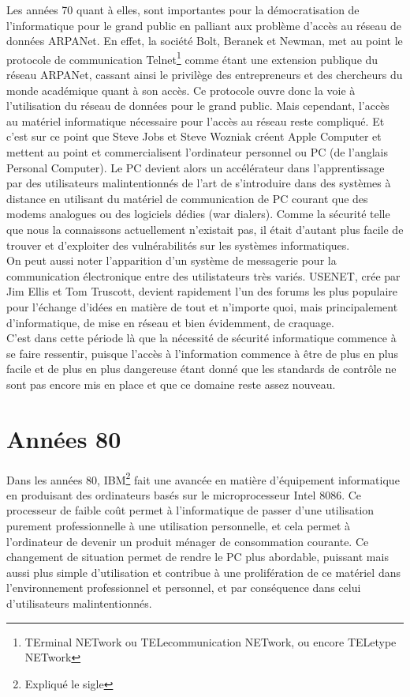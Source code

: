 \documentclass[a4paper]{memoir}
\begin{document}
Les années 70 quant à elles, sont importantes pour la démocratisation de l'informatique pour le grand public en palliant aux problème d'accès au réseau de données ARPANet. En effet, la société Bolt, Beranek et Newman, met au point le protocole de communication Telnet\footnote{TErminal NETwork ou TELecommunication NETwork, ou encore TELetype NETwork} comme étant une extension publique du réseau ARPANet, cassant ainsi le privilège des entrepreneurs et des chercheurs du monde académique quant à son accès. Ce protocole ouvre donc la voie à l'utilisation du réseau de données pour le grand public. Mais cependant, l'accès au matériel informatique nécessaire pour l'accès au réseau reste compliqué. Et c'est sur ce point que Steve Jobs et Steve Wozniak créent Apple Computer et mettent au point et commercialisent l'ordinateur personnel ou PC (de l'anglais Personal Computer). Le PC devient alors un accélérateur dans l'apprentissage par des utilisateurs malintentionnés de l'art de s'introduire dans des systèmes à distance en utilisant du matériel de communication de PC courant que des modems analogues ou des logiciels dédies (war dialers). Comme la sécurité telle que nous la connaissons actuellement n'existait pas, il était d'autant plus facile de trouver et d'exploiter des vulnérabilités sur les systèmes informatiques.\\
\noindent On peut aussi noter l'apparition d'un système de messagerie pour la communication électronique entre des utilistateurs très variés. USENET, crée par Jim Ellis et Tom Truscott, devient rapidement l'un des forums les plus populaire pour l'échange d'idées en matière de tout et n'importe quoi, mais principalement d'informatique, de mise en réseau et bien évidemment, de craquage.\\
C'est dans cette période là que la nécessité de sécurité informatique commence à se faire ressentir, puisque l'accès à l'information commence à être de plus en plus facile et de plus en plus dangereuse étant donné que les standards de contrôle ne sont pas encore mis en place et que ce domaine reste assez nouveau.


\section{Années 80}

Dans les années 80, IBM\footnote{Expliqué le sigle} fait une avancée en matière d'équipement informatique en produisant des ordinateurs basés sur le microprocesseur Intel 8086. Ce processeur de faible coût permet à l'informatique de passer d'une utilisation purement professionnelle à une utilisation personnelle, et cela permet à l'ordinateur de devenir un produit ménager de consommation courante. Ce changement de situation permet de rendre le PC plus abordable, puissant mais aussi plus simple d'utilisation et contribue à une prolifération de ce matériel dans l'environnement professionnel et personnel, et par conséquence dans celui d'utilisateurs malintentionnés.
\end{document}
